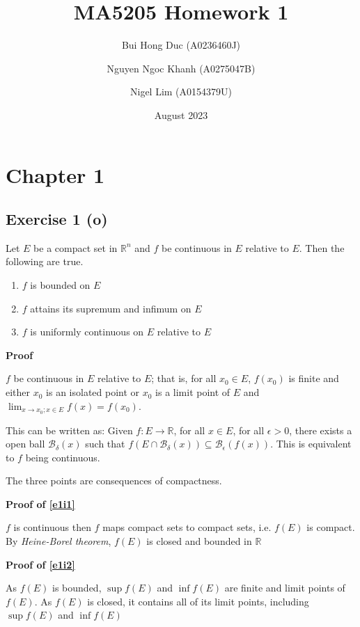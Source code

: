 \documentclass{article}
\title{MA5205 Homework 1}
\author{Bui Hong Duc (A0236460J) \and Nguyen Ngoc Khanh (A0275047B) \and Nigel Lim (A0154379U)}
\date{August 2023}
\newcommand\Ball{\mathcal{B}}
\newcommand\R{\mathbb{R}}
\begin{document}
\ifdefined\LOCAL
\typstmathinputenable{\$}
\typstmathinputprepare[\LOCALoutputfile]{\$}
\else

\fi
\typstmathinputdisable{\$}

\hfuzz=10pt

\maketitle

\section{Chapter 1}

\subsection{Exercise 1 (o)} %
Let $E$ be a compact set in $\R^n$ and $f$ be continuous in $E$ relative to $E$. Then the following are true.
\begin{enumerate}
    \item $f$ is bounded on $E$ \label{e1i1}
    \item $f$ attains its supremum and infimum on $E$ \label{e1i2}
    \item $f$ is uniformly continuous on $E$ relative to $E$ \label{e1i3}
\end{enumerate}

\textbf{Proof} %

$f$ be continuous in $E$ relative to $E$; that is, for all $x_0 \in E$, $f(x_0)$ is finite and either $x_0$ is an isolated point or $x_0$ is a limit point of $E$ and $\lim_{x \to x_0; x \in E} f(x) = f(x_0)$.

This can be written as: Given $f: E \to \R$, for all $x \in E$, for all $\epsilon > 0$, there exists a open ball $\Ball_\delta(x)$ such that $f(E \cap \Ball_\delta(x)) \subseteq \Ball_{\epsilon}(f(x))$. This is equivalent to $f$ being continuous.

The three points are consequences of compactness.

\textbf{Proof of \ref{e1i1}}

$f$ is continuous then $f$ maps compact sets to compact sets, i.e. $f(E)$ is compact. By \emph{Heine-Borel theorem}, $f(E)$ is closed and bounded in $\R$

\textbf{Proof of \ref{e1i2}}

As $f(E)$ is bounded, $\sup f(E)$ and $\inf f(E)$ are finite and limit points of $f(E)$. As $f(E)$ is closed, it contains all of its limit points, including $\sup f(E)$ and $\inf f(E)$
\end{document}
